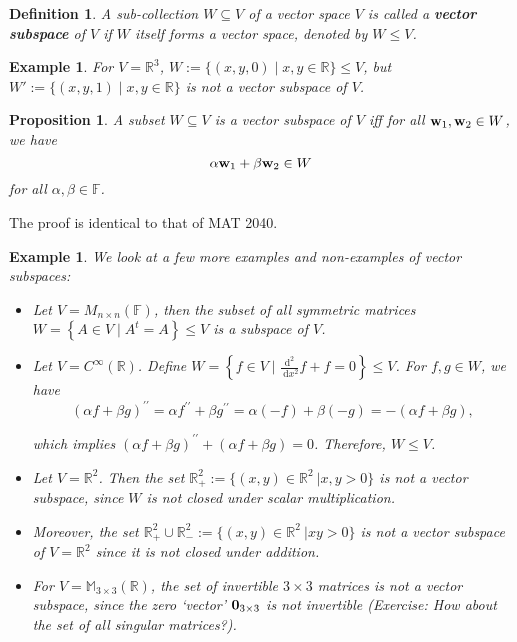 \documentclass[11pt]{article}
\newtheorem{definition}[theorem]{Definition}
\newtheorem{example}[theorem]{Example}
\newtheorem{proposition}[theorem]{Proposition}
\begin{document}
\begin{definition} A sub-collection \(W \subseteq  V\) of a vector space \(V\) is called a {\bf vector subspace} of \(V\) if \(W\) itself forms a vector space, denoted by \(W \leq  V\).
\end{definition}

\begin{example} 
For \(V = {\mathbb{R}}^{3}\), \(W := \{ \left( {x,y,0}\right)  \mid  x,y \in  \mathbb{R}\}  \leq  V\), but \(W' := \{ \left( {x,y,1}\right)  \mid  x,y \in  \mathbb{R}\}\) is not a vector subspace of \(V\).
\end{example}

\begin{proposition} A subset \(W \subseteq  V\) is a vector subspace of \(V\) iff for all \({\bf w}_1,{\bf w}_2 \in  W\), we have 
\[\alpha \mathbf{\bf w}_1 + \beta {\bf w}_2 \in  W\] 
for all \(\alpha ,\beta  \in  \mathbb{F}\).
\end{proposition}
The proof is identical to that of MAT 2040.


\begin{example} 
We look at a few more examples and non-examples of vector subspaces:
\begin{itemize}
    \item Let \(V = {M}_{n \times  n}\left( \mathbb{F}\right)\), then the subset of all symmetric matrices \(W = \left\{  A \in  V \mid  {A^t = A}\right\}   \leq  V\) is a subspace of $V$.

    \item Let \(V = {C}^{\infty }\left( \mathbb{R}\right)\). Define \(W = \left\{  {f \in  V \mid  \frac{{\mathrm{d}}^2}{\mathrm{\;d}{x}^2}f + f = 0}\right\}   \leq  V\). For \(f,g \in  W\), we have
\[
{\left( \alpha f + \beta g\right) }^{\prime \prime } = \alpha {f}^{\prime \prime } + \beta {g}^{\prime \prime } = \alpha \left( {-f}\right)  + \beta \left( {-g}\right)  =  - \left( {{\alpha f} + {\beta g}}\right) ,
\]

which implies \({\left( \alpha f + \beta g\right) }^{\prime \prime } + \left( {{\alpha f} + {\beta g}}\right)  = 0\). Therefore, $W \leq V$.

\item Let \(V = {\mathbb{R}}^2\). Then the set \( {\mathbb{R}}_{ + }^2 := \{(x,y) \in \mathbb{R}^2\ | x, y > 0\}\) is not a vector subspace, since \(W\) is not closed under scalar multiplication.

\item Moreover, the set \({\mathbb{R}}_{ + }^2 \cup {\mathbb{R}}_{ - }^2 := \{(x,y) \in \mathbb{R}^2\ | xy > 0\} \) is not a vector subspace of $V = \mathbb{R}^2$ since it is not closed under addition.

\item For \(V = {\mathbb{M}}_{3 \times  3}\left( \mathbb{R}\right)\), the set of invertible \(3 \times  3\) matrices is not a vector subspace, since the zero `vector' ${\bf0}_{3 \times 3}$ is not invertible (Exercise: How about the set of all singular matrices?).
\end{itemize}
\end{example}
\end{document}
